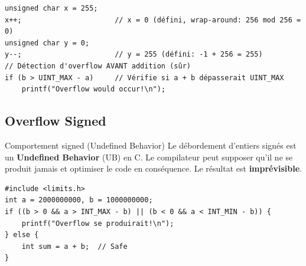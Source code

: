 \documentclass[10pt,a4paper]{article}
\begin{document}
\begin{lstlisting}[caption={Overflow unsigned}]
unsigned char x = 255;
x++;                      // x = 0 (défini, wrap-around: 256 mod 256 = 0)
unsigned char y = 0;
y--;                      // y = 255 (défini: -1 + 256 = 255)
// Détection d'overflow AVANT addition (sûr)
if (b > UINT_MAX - a)     // Vérifie si a + b dépasserait UINT_MAX
    printf("Overflow would occur!\n");
\end{lstlisting}

\subsection{Overflow Signed}

\begin{warningbox}{Comportement signed (Undefined Behavior)}
Le débordement d'entiers signés est un \textbf{Undefined Behavior} (UB) en C. Le compilateur peut supposer qu'il ne se produit jamais et optimiser le code en conséquence. Le résultat est \textbf{imprévisible}.
\end{warningbox}

\begin{center}
\end{center}

\begin{lstlisting}[caption={Détection sûre d'overflow signed AVANT l'opération}]
#include <limits.h>
int a = 2000000000, b = 1000000000;
if ((b > 0 && a > INT_MAX - b) || (b < 0 && a < INT_MIN - b)) {
    printf("Overflow se produirait!\n");
} else {
    int sum = a + b;  // Safe
}
\end{lstlisting}
\end{document}
